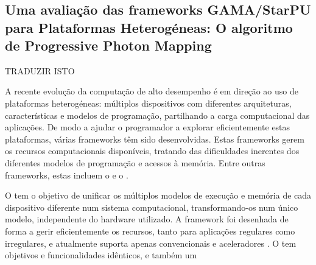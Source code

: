 \documentclass[main.tex]{subfiles}
\begin{document}
\cleardoublepage
{}
{}
\chapter*{\abstractname}
  \section*{Uma avaliação das frameworks GAMA/StarPU para Plataformas Heterogéneas: O algoritmo de Progressive Photon Mapping}

  TRADUZIR ISTO

  A recente evolução da computação de alto desempenho é em direção ao uso de plataformas heterogéneas: múltiplos dispositivos com diferentes arquiteturas, características e modelos de programação, partilhando a carga computacional das aplicações. De modo a ajudar o programador a explorar eficientemente estas plataformas, várias frameworks têm sido desenvolvidas. Estas frameworks gerem os recursos computacionais disponíveis, tratando das dificuldades inerentes dos diferentes modelos de programação e acessos à memória. Entre outras frameworks, estas incluem o \gama e o \starpu.

  O \gama tem o objetivo de unificar os múltiplos modelos de execução e memória de cada dispositivo diferente num sistema computacional, transformando-os num único modelo, independente do hardware utilizado. A framework foi desenhada de forma a gerir eficientemente os recursos, tanto para aplicações regulares como irregulares, e atualmente suporta apenas \cpus convencionais e aceleradores \cuda. O \starpu tem objetivos e funcionalidades idênticos, e também um
\end{document}
